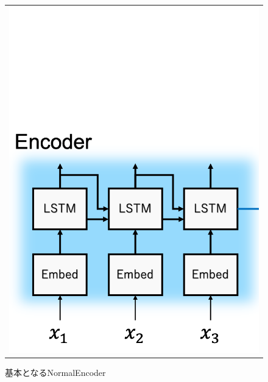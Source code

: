 \documentclass[a4paper,twocolumn]{jsarticle}
\begin{document}
\begin{figure}[htpb]
  \centering
  \begin{tabular}{c}

    \begin{minipage}{0.33\hsize}
      \centering
      \includegraphics[width=\linewidth]{image/seq2seq_image_encoder.png}
      \caption{基本となるNormalEncoder}
      \label{fig:seq2seq}
    \end{minipage}


\end{tabular}
\end{figure}
\end{document}
